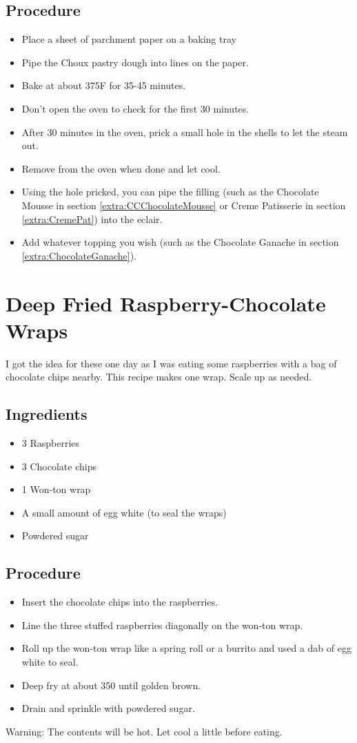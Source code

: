 \documentclass[10pt, openany]{book}
\begin{document}
\subsection{Procedure}
\begin{itemize}
  \item Place a sheet of parchment paper on a baking tray
  \item Pipe the Choux pastry dough into lines on the paper.
  \item Bake at about 375\degree{}F for 35-45 minutes.
  \item Don't open the oven to check for the first 30 minutes.
  \item After 30 minutes in the oven, prick a small hole in the shells to let the steam out.
  \item Remove from the oven when done and let cool.
  \item Using the hole pricked, you can pipe the filling (such as the Chocolate Mousse in section \ref{extra:CCChocolateMousse} or Creme Patisserie in section  \ref{extra:CremePat}) into the eclair.
  \item Add whatever topping you wish (such as the Chocolate Ganache in section \ref{extra:ChocolateGanache}).
\end{itemize}

\section{Deep Fried Raspberry-Chocolate Wraps}
\label{pastry:RaspberryChocolateWrap}
I got the idea for these one day as I was eating some raspberries with a bag of chocolate chips nearby.  This recipe makes one wrap.  Scale up as needed.
\subsection{Ingredients}
\begin{itemize}
  \item 3 Raspberries
  \item 3 Chocolate chips
  \item 1 Won-ton wrap
  \item A small amount of egg white (to seal the wraps)
  \item Powdered sugar
\end{itemize}
\subsection{Procedure}
\begin{itemize}
  \item Insert the chocolate chips into the raspberries.
  \item Line the three stuffed raspberries diagonally on the won-ton wrap.
  \item Roll up the won-ton wrap like a spring roll or a burrito and used a dab of egg white to seal.
  \item Deep fry at about 350\degree{} until golden brown.
  \item Drain and sprinkle with powdered sugar.
\end{itemize}
Warning: The contents will be hot.  Let cool a little before eating.
\end{document}
